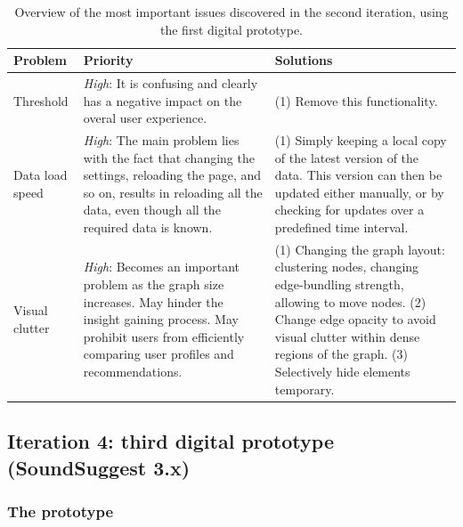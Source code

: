 \begin{table}
	\caption{Overview of the most important issues discovered in the second iteration, using the first digital prototype.}
	\begin{center}
		\begin{tabular}{p{70px} | p{180px} | p{180px} }
			\hline
			\textbf{Problem} & \textbf{Priority} & \textbf{Solutions} \\
			\hline
			
			Threshold
			&
			\emph{High}: It is confusing and clearly has a negative impact on the overal user experience.
			&
			(1) Remove this functionality.
			\\
			
			Data load speed
			&
			\emph{High}: The main problem lies with the fact that changing the settings, reloading the page, and so on, results in reloading all the data, even though all the required data is known.
			&
			(1) Simply keeping a local copy of the latest version of the data. This version can then be updated either manually, or by checking for updates over a predefined time interval.
			\\
			
			Visual clutter
			&
			\emph{High}: Becomes an important problem as the graph size increases. May hinder the insight gaining process. May prohibit users from efficiently comparing user profiles and recommendations.
			&
			(1) Changing the graph layout: clustering nodes, changing edge-bundling strength, allowing to move nodes. (2) Change edge opacity to avoid visual clutter within dense regions of the graph. (3) Selectively hide elements temporary.
			\\
			
			\hline
		\end{tabular}
	\end{center}
\label{table:iteration2:issues}
\end{table}




\subsection{Iteration 4: third digital prototype (SoundSuggest 3.x)}\label{chapter:prototype:section:soundsuggest3}

\subsubsection{The prototype}\label{chapter:prototype:section:soundsuggest3:prototype}

